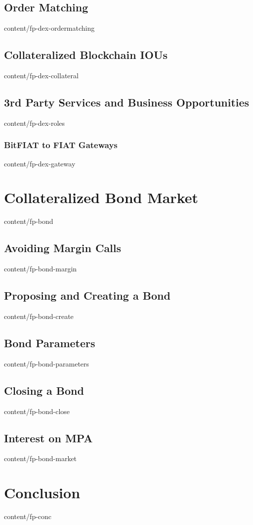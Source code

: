 \documentclass[conference,final,10pt,a4paper]{IEEEtran}
\begin{document}
\subsection    { Order Matching                                  }  { content/fp-dex-ordermatching   } 
\subsection    { Collateralized Blockchain IOUs                  }  { content/fp-dex-collateral      } 
\subsection    { 3rd Party Services and Business Opportunities   }  { content/fp-dex-roles           } 
\subsubsection { BitFIAT to FIAT Gateways                        }  { content/fp-dex-gateway         } 

\section       { Collateralized Bond Market                      }  { content/fp-bond                } 
\subsection    { Avoiding Margin Calls                           }  { content/fp-bond-margin         } 
\subsection    { Proposing and Creating a Bond                   }  { content/fp-bond-create         } 
\subsection    { Bond Parameters                                 }  { content/fp-bond-parameters     } 
\subsection    { Closing a Bond                                  }  { content/fp-bond-close          } 
\subsection    { Interest on MPA                                 }  { content/fp-bond-market         } 

\section       { Conclusion                                      }  { content/fp-conc                } 


\end{document}

